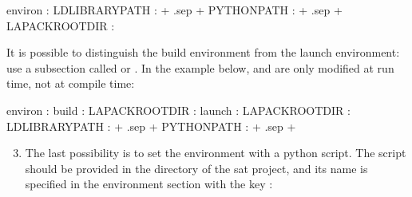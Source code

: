 \documentclass[a4paper,10pt,english]{sphinxmanual}
\begin{document}
%
\begin{sphinxVerbatim}[commandchars=\\\{\}]
environ :
  \PYGZus{}LD\PYGZus{}LIBRARY\PYGZus{}PATH :  + .sep + 
  PYTHONPATH\PYGZus{} :  + .sep + 
  LAPACK\PYGZus{}ROOT\PYGZus{}DIR : 
\end{sphinxVerbatim}

It is possible to distinguish the build environment from the launch environment: use a subsection called  or . In the example below,  and  are only modified at run time, not at compile time:

%
\begin{sphinxVerbatim}[commandchars=\\\{\}]
environ :
  build :
    LAPACK\PYGZus{}ROOT\PYGZus{}DIR : 
  launch :
    LAPACK\PYGZus{}ROOT\PYGZus{}DIR : 
    \PYGZus{}LD\PYGZus{}LIBRARY\PYGZus{}PATH :  + .sep + 
    PYTHONPATH\PYGZus{} :  + .sep + 
\end{sphinxVerbatim}
\begin{enumerate}
\setcounter{enumi}{2}
\item {} 
The last possibility is to set the environment with a python script. The script should be provided in the  directory of the sat project, and its name is specified in the environment section with the key :

\end{enumerate}

%
\begin{sphinxVerbatim}[commandchars=\\\{\}]
 
    
\end{sphinxVerbatim}
\end{document}
